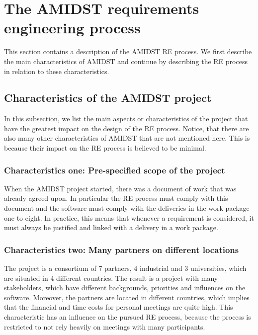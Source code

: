 \section{The AMIDST requirements engineering process}
\label{sec:AmidstRequirementProcess}

This section contains a description of the AMIDST RE process.  We first describe the main characteristics of AMIDST and continue by describing the RE process in relation to these characteristics.

\subsection{Characteristics of the AMIDST project}
\label{sec:characteristics}

In this subsection, we list the main aspects or characteristics of the project that have the greatest impact on the design of the RE process.  Notice, that there are also many other characteristics of AMIDST that are not mentioned here.  This is because their impact on the RE process is believed to be minimal.  


\subsubsection*{Characteristics one:  Pre-specified scope of the project}
\label{sec:characteristic1}

When the AMIDST project started, there was a document of work that was already agreed upon.  In particular the RE process must comply with this document and the software must comply with the deliveries in the work package one to eight.  In practice, this means that whenever a requirement is considered, it must always be justified and linked with a delivery in a work package.

\subsubsection*{Characteristics two: Many partners on different locations}
\label{sec:characteristic2}
The project is a consortium of 7 partners, 4 industrial and 3 universities, which are situated in 4 different countries.  The result is a project with many stakeholders, which have different backgrounds, priorities and influences on the software. Moreover, the partners are located in different countries, which implies that the financial and time costs for personal meetings are quite high.  This characteristic has an influence on the pursued RE process, because the process is restricted to not rely heavily on meetings with many participants.

